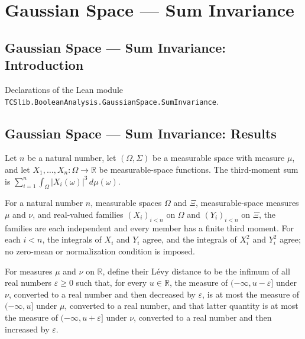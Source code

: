\section{Gaussian Space --- Sum Invariance}
\subsection*{Gaussian Space --- Sum Invariance: Introduction}

Declarations of the Lean module \texttt{TCSlib.BooleanAnalysis.GaussianSpace.SumInvariance}.

\subsection*{Gaussian Space --- Sum Invariance: Results}

\begin{definition}
\label{BooleanAnalysis.GaussianSpace.thirdMomentSum}
\leanok
Let $n$ be a natural number, let $(\Omega,\Sigma)$ be a measurable space with measure
$\mu$, and let $X_1,\ldots,X_n:\Omega\to\mathbb{R}$ be measurable-space functions. The
third-moment sum is $\sum_{i=1}^n\int_\Omega |X_i(\omega)|^3\,d\mu(\omega)$.
\end{definition}

\begin{definition}
\label{BooleanAnalysis.GaussianSpace.MatchesSumMoments}
\leanok
For a natural number $n$, measurable spaces $\Omega$ and $\Xi$, measurable-space
measures $\mu$ and $\nu$, and real-valued families $(X_i)_{i<n}$ on $\Omega$
and $(Y_i)_{i<n}$ on $\Xi$, the families are each independent and every member has a
finite third moment. For each $i<n$, the integrals of $X_i$ and $Y_i$ agree, and the
integrals of $X_i^2$ and $Y_i^2$ agree; no zero-mean or normalization condition is
imposed.
\end{definition}

\begin{definition}
\label{BooleanAnalysis.GaussianSpace.levyDistance}
\leanok
For measures $\mu$ and $\nu$ on $\mathbb R$, define their Lévy distance to be the
infimum of all real numbers $\varepsilon \ge 0$ such that, for every $u \in \mathbb R$,
the measure of $(-\infty,u-\varepsilon]$ under $\nu$, converted to a real number and
then decreased by $\varepsilon$, is at most the measure of $(-\infty,u]$ under $\mu$,
converted to a real number, and that latter quantity is at most the measure of
$(-\infty,u+\varepsilon]$ under $\nu$, converted to a real number and then increased by
$\varepsilon$.
\end{definition}

